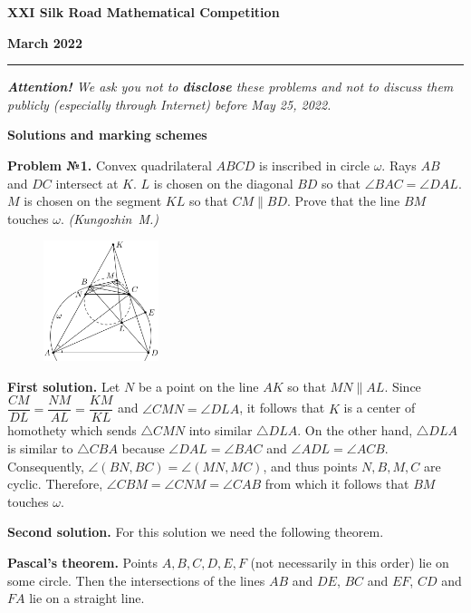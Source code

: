 \documentclass[12pt]{article}
\newcounter{problem}
\def \Problem#1{\par \bigskip \textbf{Problem №{#1}. }}
\def \solutionI{\par \bigskip \textbf{First solution. }}
\def\solutionII{\par \noindent \textbf{Second solution. }}
\begin{document}
\centerline{\sc \textbf{XXI Silk Road Mathematical Competition}}

\centerline{\sc \textbf{March 2022}}

\bigskip
\hrule
\bigskip

\textsl{\textbf{Attention!} 
We ask you not to \textbf{disclose} these problems and not to discuss them publicly (especially through Internet) before May 25, 2022.}

\bigskip

\centerline{\sc \textbf{Solutions and marking schemes}}

\bigskip

\bigskip
\Problem{1} Convex quadrilateral $ABCD$ is inscribed in circle $\omega$. Rays $AB$ and $DC$ intersect at $K$. $L$ is chosen on the diagonal $BD$ so that $\angle BAC = \angle DAL$. $M$ is chosen on the segment $KL$ so that $CM \parallel BD$. Prove that the line $BM$ touches $\omega$. \textit{(Kungozhin~M.)}

\begin{figure}
\includegraphics[width=0.3\textwidth]{img_1.jpg}
\end{figure}

\solutionI Let $N$ be a point on the line $AK$ so that $MN \parallel AL$. Since
$\dfrac{CM}{DL} = \dfrac{NM}{AL} = \dfrac{KM}{KL}$ and $\angle CMN = \angle DLA$, it follows that $K$ is a center of homothety which sends $\triangle CMN$ into similar $\triangle DLA$. On the other hand, $\triangle DLA$ is similar to $\triangle CBA$ because $\angle DAL = \angle BAC$ and $\angle ADL = \angle ACB$. Consequently, $\angle(BN, BC) = \angle(MN, MC)$, and thus points $N, B, M, C$ are cyclic. Therefore, $\angle CBM = \angle CNM = \angle CAB$ from which it follows that $BM$ touches $\omega$.

\solutionII For this solution we need the following theorem.

\textbf{Pascal's theorem.} Points $A, B, C, D, E, F$ (not necessarily in this order) lie on some circle. Then the intersections of the lines $AB$ and $DE$, $BC$ and $EF$, $CD$ and $FA$ lie on a straight line.
\end{document}
